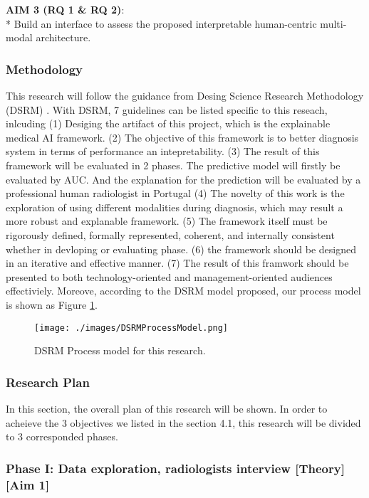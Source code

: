 \noindent
\textbf{AIM 3 (RQ 1 \& RQ 2)}:\\*
Build an interface to assess the proposed interpretable human-centric multi-modal architecture.


\subsubsection{Methodology}
This research will follow the guidance from Desing Science Research Methodology (DSRM) \citep{Hevner2004DSRM}. With DSRM, 7 guidelines can be listed specific to this reseach, inlcuding (1) Desiging the artifact of this project, which is the explainable medical AI framework. (2) The objective of this framework is to better diagnosis system in terms of performance an intepretability. (3) The result of this framework will be evaluated in 2 phases. The predictive model will firstly be evaluated by AUC. And the explanation for the prediction will be evaluated by a professional human radiologist in Portugal (4) The novelty of this work is the exploration of using different modalities during diagnosis, which may result a more robust and explanable framework. (5) The framework itself must be rigorously defined, formally represented, coherent, and internally consistent whether in devloping or evaluating phase. (6) the framework should be designed in an iterative and effective manner. (7) The result of this framwork should be presented to both technology-oriented and management-oriented audiences effectiviely. Moreove, according to the DSRM model \citep{Peffers2007DSRMForIS} proposed, our process model is shown as Figure \ref{fig: DSRMProcessModel}.


\begin{figure}[!h]
    \centering
    \texttt{[image: ./images/DSRMProcessModel.png]}
    \caption{DSRM Process model for this research.}
    \label{fig: DSRMProcessModel}
\end{figure}

\subsubsection{Research Plan}


In this section, the overall plan of this research will be shown. In order to acheieve the 3 objectives we listed in the section 4.1, this research will be divided to 3 corresponded phases.

\subsubsection*{Phase I: Data exploration, radiologists interview [Theory] [Aim 1]}

